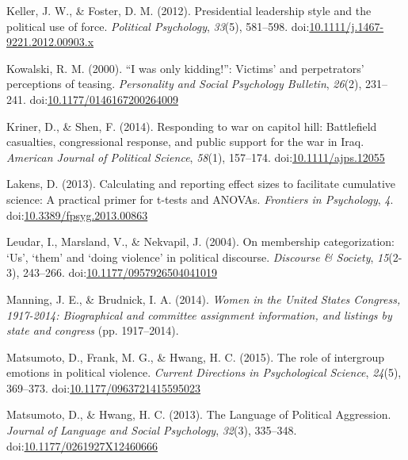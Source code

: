 \documentclass[
  english,
  ,man,floatsintext]{apa6}
\begin{document}
\leavevmode\hypertarget{ref-Keller2012}{}%
Keller, J. W., \& Foster, D. M. (2012). Presidential leadership style and the political use of force. \emph{Political Psychology}, \emph{33}(5), 581--598. doi:\href{https://doi.org/10.1111/j.1467-9221.2012.00903.x}{10.1111/j.1467-9221.2012.00903.x}

\leavevmode\hypertarget{ref-Kowalski2000}{}%
Kowalski, R. M. (2000). ``I was only kidding!'': Victims' and perpetrators' perceptions of teasing. \emph{Personality and Social Psychology Bulletin}, \emph{26}(2), 231--241. doi:\href{https://doi.org/10.1177/0146167200264009}{10.1177/0146167200264009}

\leavevmode\hypertarget{ref-Kriner2014}{}%
Kriner, D., \& Shen, F. (2014). Responding to war on capitol hill: Battlefield casualties, congressional response, and public support for the war in Iraq. \emph{American Journal of Political Science}, \emph{58}(1), 157--174. doi:\href{https://doi.org/10.1111/ajps.12055}{10.1111/ajps.12055}

\leavevmode\hypertarget{ref-Lakens2013}{}%
Lakens, D. (2013). Calculating and reporting effect sizes to facilitate cumulative science: A practical primer for t-tests and ANOVAs. \emph{Frontiers in Psychology}, \emph{4}. doi:\href{https://doi.org/10.3389/fpsyg.2013.00863}{10.3389/fpsyg.2013.00863}

\leavevmode\hypertarget{ref-Leudar2004}{}%
Leudar, I., Marsland, V., \& Nekvapil, J. (2004). On membership categorization: `Us', `them' and `doing violence' in political discourse. \emph{Discourse \& Society}, \emph{15}(2-3), 243--266. doi:\href{https://doi.org/10.1177/0957926504041019}{10.1177/0957926504041019}

\leavevmode\hypertarget{ref-Manning2014}{}%
Manning, J. E., \& Brudnick, I. A. (2014). \emph{Women in the United States Congress, 1917-2014: Biographical and committee assignment information, and listings by state and congress} (pp. 1917--2014).

\leavevmode\hypertarget{ref-Matsumoto2015}{}%
Matsumoto, D., Frank, M. G., \& Hwang, H. C. (2015). The role of intergroup emotions in political violence. \emph{Current Directions in Psychological Science}, \emph{24}(5), 369--373. doi:\href{https://doi.org/10.1177/0963721415595023}{10.1177/0963721415595023}

\leavevmode\hypertarget{ref-Matsumoto2013}{}%
Matsumoto, D., \& Hwang, H. C. (2013). The Language of Political Aggression. \emph{Journal of Language and Social Psychology}, \emph{32}(3), 335--348. doi:\href{https://doi.org/10.1177/0261927X12460666}{10.1177/0261927X12460666}
\end{document}
